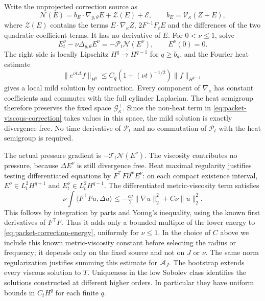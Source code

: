 Write the unprojected correction source as
\[
 \mathcal N(E)=b_E\cdot\nabla_{y,\theta}E+\mathcal Z(E)+\mathcal E,
 \qquad b_E=\mathcal V_\kappa(Z+E),
\]
where $\mathcal Z(E)$ contains the terms $E\cdot\nabla_\kappa Z$,
$2F^{-1}F_tE$ and the differences of the two quadratic coefficient
terms. It has no derivative of $E$. For $0<\nu\le1$, solve
\begin{equation}\label{eq:packet-viscous-correction}
 E_t^\nu-\nu\Delta_{y,\theta}E^\nu
       =-\mathcal P_t\mathcal N(E^\nu),\qquad E^\nu(0)=0.
\end{equation}
The right side is locally Lipschitz $H^q\to H^{q-1}$ for
$q\ge b_d$, and the Fourier heat estimate
\[
 \|e^{\nu t\Delta}f\|_{H^q}
       \le C_q(1+(\nu t)^{-1/2})\|f\|_{H^{q-1}}
\]
gives a local mild solution by contraction. Every component of
$\nabla_\kappa$ has constant coefficients and commutes with the full
cylinder Laplacian. The heat semigroup therefore preserves the fixed
space $\mathscr G_\kappa^\perp$. Since the non-heat term in
\eqref{eq:packet-viscous-correction} takes values in this space, the mild
solution is exactly divergence free. No time derivative of
$\mathcal P_t$ and no commutation of $\mathcal P_t$ with the heat
semigroup is required.

The actual pressure gradient is
$-\mathcal T_t\mathcal N(E^\nu)$. The viscosity contributes no pressure,
because $\Delta E^\nu$ is still divergence free. Heat maximal regularity
justifies testing differentiated equations by
$F^{\top}F\partial^wE^\nu$: on each compact existence interval,
$E^\nu\in L^2_tH^{q+1}$ and $E_t^\nu\in L^2_tH^{q-1}$.
The differentiated metric-viscosity term satisfies
\[
 \nu\int\langle F^{\top}F u,\Delta u\rangle
       \le-\tfrac{c\nu}{2}\|\nabla u\|_2^2+C\nu\|u\|_2^2.
\]
This follows by integration by parts and Young's inequality, using the
known first derivatives of $F^{\top}F$. Thus it adds only a bounded
multiple of the lower energy to \eqref{eq:packet-correction-energy},
uniformly for $\nu\le1$. In the choice of $C$ above we include this
known metric-viscosity constant before selecting the radius or frequency;
it depends only on the fixed source and not on $J$ or $\nu$.
The same norm regularization justifies summing this estimate for
$\mathcal A_J$. The bootstrap extends every viscous solution
to $T$. Uniqueness in the low Sobolev class identifies the solutions
constructed at different higher orders. In particular they have uniform
bounds in $C_tH^q$ for each finite $q$.

